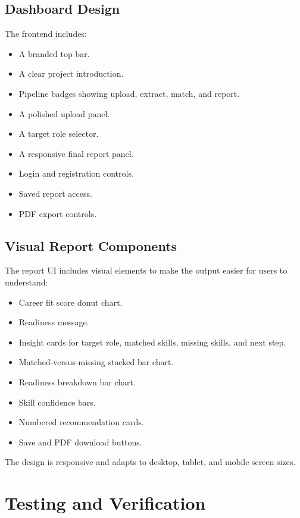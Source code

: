 \documentclass[12pt,a4paper]{article}
\begin{document}
\subsection{Dashboard Design}

The frontend includes:

\begin{itemize}
    \item A branded top bar.
    \item A clear project introduction.
    \item Pipeline badges showing upload, extract, match, and report.
    \item A polished upload panel.
    \item A target role selector.
    \item A responsive final report panel.
    \item Login and registration controls.
    \item Saved report access.
    \item PDF export controls.
\end{itemize}

\subsection{Visual Report Components}

The report UI includes visual elements to make the output easier for users to understand:

\begin{itemize}
    \item Career fit score donut chart.
    \item Readiness message.
    \item Insight cards for target role, matched skills, missing skills, and next step.
    \item Matched-versus-missing stacked bar chart.
    \item Readiness breakdown bar chart.
    \item Skill confidence bars.
    \item Numbered recommendation cards.
    \item Save and PDF download buttons.
\end{itemize}

The design is responsive and adapts to desktop, tablet, and mobile screen sizes.

\section{Testing and Verification}
\end{document}
